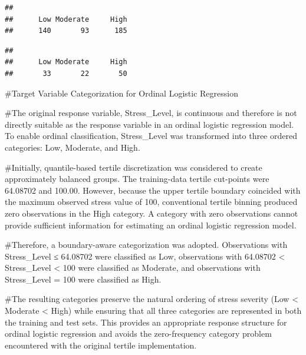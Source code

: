 \documentclass[
]{article}
\newenvironment{Shaded}{\begin{snugshade}}{\end{snugshade}}
\newcommand{\FunctionTok}[1]{\textcolor[rgb]{0.13,0.29,0.53}{\textbf{#1}}}
\newcommand{\NormalTok}[1]{#1}
\newcommand{\SpecialCharTok}[1]{\textcolor[rgb]{0.81,0.36,0.00}{\textbf{#1}}}
\begin{document}
\begin{Shaded}
\end{Shaded}

\begin{verbatim}
## 
##      Low Moderate     High 
##      140       93      185
\end{verbatim}

\begin{Shaded}
\end{Shaded}

\begin{verbatim}
## 
##      Low Moderate     High 
##       33       22       50
\end{verbatim}

\#Target Variable Categorization for Ordinal Logistic Regression

\#The original response variable, Stress\_Level, is continuous and
therefore is not directly suitable as the response variable in an
ordinal logistic regression model. To enable ordinal classification,
Stress\_Level was transformed into three ordered categories: Low,
Moderate, and High.

\#Initially, quantile-based tertile discretization was considered to
create approximately balanced groups. The training-data tertile
cut-points were 64.08702 and 100.00. However, because the upper tertile
boundary coincided with the maximum observed stress value of 100,
conventional tertile binning produced zero observations in the High
category. A category with zero observations cannot provide sufficient
information for estimating an ordinal logistic regression model.

\#Therefore, a boundary-aware categorization was adopted. Observations
with Stress\_Level ≤ 64.08702 were classified as Low, observations with
64.08702 \textless{} Stress\_Level \textless{} 100 were classified as
Moderate, and observations with Stress\_Level = 100 were classified as
High.

\#The resulting categories preserve the natural ordering of stress
severity (Low \textless{} Moderate \textless{} High) while ensuring that
all three categories are represented in both the training and test sets.
This provides an appropriate response structure for ordinal logistic
regression and avoids the zero-frequency category problem encountered
with the original tertile implementation.
\end{document}
